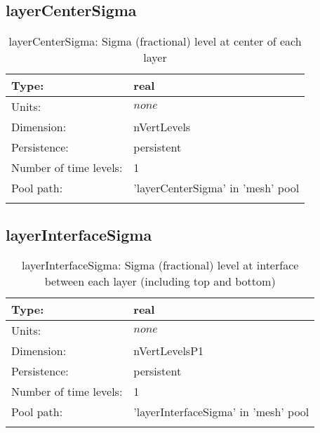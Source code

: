 \subsection[layerCenterSigma]{layerCenterSigma}
\label{subsec:var_sec_mesh_layerCenterSigma}
\begin{center}
\begin{longtable}{| p{2.0in} | p{4.0in} |}
        \hline 
        Type: & real \\
        \hline 
        Units: & $none$ \\
        \hline 
        Dimension: & nVertLevels \\
        \hline 
        Persistence: & persistent \\
        \hline 
        Number of time levels: & 1 \\
        \hline 
            Pool path: & 'layerCenterSigma' in 'mesh' pool
 \\
		 \hline 
    \caption{layerCenterSigma: Sigma (fractional) level at center of each layer}
\end{longtable}
\end{center}
\subsection[layerInterfaceSigma]{layerInterfaceSigma}
\label{subsec:var_sec_mesh_layerInterfaceSigma}
\begin{center}
\begin{longtable}{| p{2.0in} | p{4.0in} |}
        \hline 
        Type: & real \\
        \hline 
        Units: & $none$ \\
        \hline 
        Dimension: & nVertLevelsP1 \\
        \hline 
        Persistence: & persistent \\
        \hline 
        Number of time levels: & 1 \\
        \hline 
            Pool path: & 'layerInterfaceSigma' in 'mesh' pool
 \\
		 \hline 
    \caption{layerInterfaceSigma: Sigma (fractional) level at interface between each layer (including top and bottom)}
\end{longtable}
\end{center}
